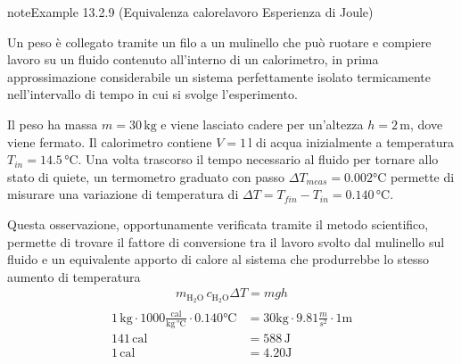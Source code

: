 \documentclass[letterpaper,10pt,italian]{jupyterBook}
\begin{document}
\begin{sphinxadmonition}{note}{Example 13.2.9 (Equivalenza calore\sphinxhyphen{}lavoro \sphinxhyphen{} Esperienza di Joule)}



\sphinxAtStartPar
Un peso è collegato tramite un filo a un mulinello che può ruotare e compiere lavoro su un fluido contenuto all’interno di un calorimetro, in prima approssimazione considerabile un sistema perfettamente isolato termicamente nell’intervallo di tempo in cui si svolge l’esperimento.

\sphinxAtStartPar
Il peso ha massa \(m = 30 \, \text{kg}\) e viene lasciato cadere per un’altezza \(h = 2 \, \text{m}\), dove viene fermato. Il calorimetro contiene \(V = 1 \, \text{l}\) di acqua inizialmente a temperatura \(T_{in} = 14.5 \, \text{°C}\). Una volta trascorso il tempo necessario al fluido per tornare allo stato di quiete, un termometro graduato con passo \(\Delta T_{meas} = 0.002 \text{°C}\) permette di misurare una variazione di temperatura di \(\Delta T = T_{fin} - T_{in} = 0.140 \, \text{°C}\).

\sphinxAtStartPar
Questa osservazione, opportunamente verificata tramite il metodo scientifico, permette di trovare il fattore di conversione tra il lavoro svolto dal mulinello sul fluido e un equivalente apporto di calore al sistema che produrrebbe lo stesso aumento di temperatura
\begin{equation*}
\begin{split}m_{\text{H$_2$O}} \, c_{\text{H$_2$O}} \Delta T = m g h\end{split}
\end{equation*}\begin{equation*}
\begin{split}\begin{aligned}
  1 \, \text{kg} \cdot 1000 \frac{\text{cal}}{\text{kg} \, \text{°C}} \cdot 0.140 \text{°C} & = 30 \text{kg} \cdot 9.81 \frac{m}{s^2} \cdot 1 \text{m} \\
  141 \, \text{cal} & = 588 \, \text{J} \\
  1 \, \text{cal} & = 4.20 \text{J}
\end{aligned}\end{split}
\end{equation*}\end{sphinxadmonition}
\label{ch/thermodynamics/foundation-experiments:thermodynamics:history:heat-work:second}
\end{document}

